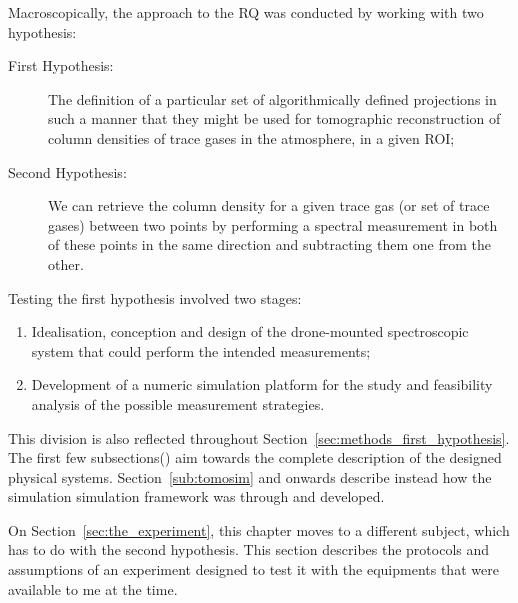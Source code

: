 Macroscopically, the approach to the \gls{RQ} was conducted by working
with two hypothesis:
\begin{description}
    \item[First Hypothesis:] The definition of a particular set of
        algorithmically defined projections in such a manner that they
        might be used for tomographic reconstruction of column densities
        of trace gases in the atmosphere, in a given \gls{ROI};
    \item[Second Hypothesis:] We can retrieve the column density for a
        given trace gas (or set of trace gases) between two points by
        performing a spectral measurement in both of these points in the
        same direction and subtracting them one from the other.
\end{description}

Testing the first hypothesis involved two stages:
\begin{enumerate}
    \item Idealisation, conception and design of the drone-mounted
        spectroscopic system that could perform the intended
        measurements;
    \item Development of a numeric simulation platform for the study and
        feasibility analysis of the possible measurement strategies.
\end{enumerate}

This division is also reflected throughout
Section~\ref{sec:methods_first_hypothesis}. The first few
subsections() aim
towards the complete description of the designed physical systems.
Section~\ref{sub:tomosim} and onwards describe instead how the
simulation simulation framework was through and developed.

On Section~\ref{sec:the_experiment}, this chapter moves to a different
subject, which has to do with the second hypothesis. This section
describes the protocols and assumptions of an experiment designed to
test it with the equipments that were available to me at the time.


